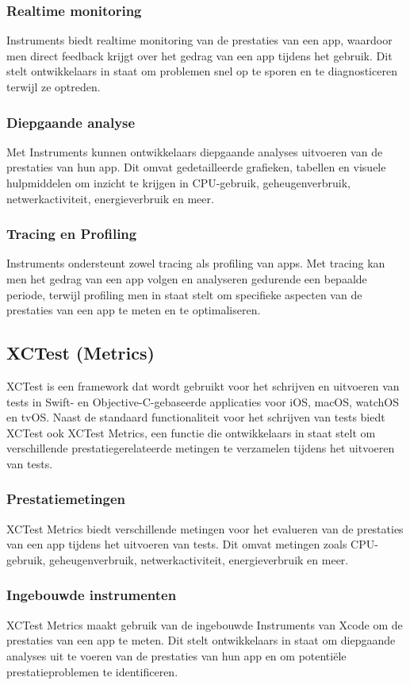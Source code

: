 \subsubsection{Realtime monitoring}
Instruments biedt realtime monitoring van de prestaties van een app, waardoor men direct feedback krijgt over het gedrag van een app tijdens het gebruik. Dit stelt ontwikkelaars in staat om problemen snel op te sporen en te diagnosticeren terwijl ze optreden.
\subsubsection{Diepgaande analyse}
Met Instruments kunnen ontwikkelaars diepgaande analyses uitvoeren van de prestaties van hun app. Dit omvat gedetailleerde grafieken, tabellen en visuele hulpmiddelen om inzicht te krijgen in CPU-gebruik, geheugenverbruik, netwerkactiviteit, energieverbruik en meer.
\subsubsection{Tracing en Profiling}
Instruments ondersteunt zowel tracing als profiling van apps. Met tracing kan men het gedrag van een app volgen en analyseren gedurende een bepaalde periode, terwijl profiling men in staat stelt om specifieke aspecten van de prestaties van een app te meten en te optimaliseren.

\subsection{XCTest (Metrics)}
XCTest is een framework dat wordt gebruikt voor het schrijven en uitvoeren van tests in Swift- en Objective-C-gebaseerde applicaties voor iOS, macOS, watchOS en tvOS. Naast de standaard functionaliteit voor het schrijven van tests biedt XCTest ook XCTest Metrics, een functie die ontwikkelaars in staat stelt om verschillende prestatiegerelateerde metingen te verzamelen tijdens het uitvoeren van tests.

\subsubsection{Prestatiemetingen}
XCTest Metrics biedt verschillende metingen voor het evalueren van de prestaties van een app tijdens het uitvoeren van tests. Dit omvat metingen zoals CPU-gebruik, geheugenverbruik, netwerkactiviteit, energieverbruik en meer.
\subsubsection{Ingebouwde instrumenten}
XCTest Metrics maakt gebruik van de ingebouwde Instruments van Xcode om de prestaties van een app te meten. Dit stelt ontwikkelaars in staat om diepgaande analyses uit te voeren van de prestaties van hun app en om potentiële prestatieproblemen te identificeren.
